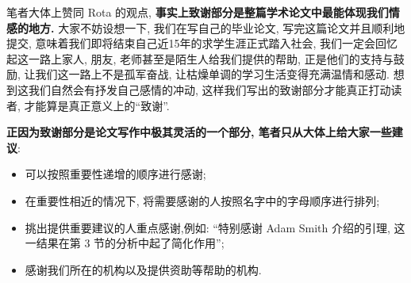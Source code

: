 \documentclass{booki}
\begin{document}
笔者大体上赞同 Rota 的观点, \textbf{事实上致谢部分是整篇学术论文中最能体现我们情感的地方. }大家不妨设想一下, 我们在写自己的毕业论文, 写完这篇论文并且顺利地提交, 意味着我们即将结束自己近15年的求学生涯正式踏入社会, 我们一定会回忆起这一路上家人, 朋友, 老师甚至是陌生人给我们提供的帮助, 正是他们的支持与鼓励, 让我们这一路上不是孤军奋战, 让枯燥单调的学习生活变得充满温情和感动. 想到这我们自然会有抒发自己感情的冲动, 这样我们写出的致谢部分才能真正打动读者, 才能算是真正意义上的``致谢''.
\par \textbf{正因为致谢部分是论文写作中极其灵活的一个部分, 笔者只从大体上给大家一些建议}:
\begin{itemize}
    \item 可以按照重要性递增的顺序进行感谢{;}
    \item 在重要性相近的情况下, 将需要感谢的人按照名字中的字母顺序进行排列{;}
    \item 挑出提供重要建议的人重点感谢,例如: ``特别感谢 Adam Smith 介绍的引理, 这一结果在第 3 节的分析中起了简化作用''{;}
    \item 感谢我们所在的机构以及提供资助等帮助的机构{.}
\end{itemize}
\end{document}
